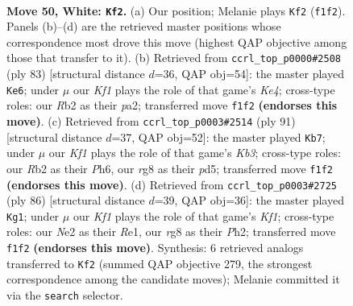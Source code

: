 \documentclass[11pt]{article}
\begin{document}
\clearpage

\begin{figure}[p]\centering
\begin{subfigure}{0.46\textwidth}\centering
\resizebox{\linewidth}{!}{%
\newchessgame
\chessboard[
  setfen={6r1/R7/3pk1p1/5n1p/8/1p6/1R2N1P1/5K1r w - - 6 50},
  showmover=false,
  pgfstyle=straightmove, color=movearrow, markmove={f1-f2}
]}
\caption{}
\end{subfigure}\hfill
\begin{subfigure}{0.46\textwidth}\centering
\resizebox{\linewidth}{!}{%
\newchessgame
\chessboard[
  setfen={3r4/8/8/pR2kp2/5n2/2N5/PPK2P2/8 b - - 6 42},
  showmover=false,
  pgfstyle=straightmove, color=movearrow, markmove={e5-e6}
]}
\caption{}
\end{subfigure}
\\[4pt]
\begin{subfigure}{0.46\textwidth}\centering
\resizebox{\linewidth}{!}{%
\newchessgame
\chessboard[
  setfen={8/8/nk2R2p/p2P4/4P2p/2P1KP2/r6P/8 b - - 3 46},
  showmover=false,
  pgfstyle=straightmove, color=movearrow, markmove={b6-b7}
]}
\caption{}
\end{subfigure}\hfill
\begin{subfigure}{0.46\textwidth}\centering
\resizebox{\linewidth}{!}{%
\newchessgame
\chessboard[
  setfen={3R4/p4pk1/5n2/p4rpp/8/8/6PP/4RK2 w - - 0 44},
  showmover=false,
  pgfstyle=straightmove, color=movearrow, markmove={f1-g1}
]}
\caption{}
\end{subfigure}
\caption{\textbf{Move 50, White: \texttt{Kf2}.} (a) Our position; Melanie plays \texttt{Kf2} (\texttt{f1f2}). Panels (b)--(d) are the retrieved master positions whose correspondence most drove this move (highest QAP objective among those that transfer to it). (b) Retrieved from \texttt{ccrl\_top\_p0000\#2508} (ply 83) [structural distance $d$=36, QAP obj=54]: the master played \texttt{Ke6}; under $\mu$ our \emph{Kf1} plays the role of that game's \emph{Ke4}; cross-type roles: our \emph{R}b2 as their \emph{p}a2; transferred move \texttt{f1f2} \textbf{(endorses this move)}. (c) Retrieved from \texttt{ccrl\_top\_p0003\#2514} (ply 91) [structural distance $d$=37, QAP obj=52]: the master played \texttt{Kb7}; under $\mu$ our \emph{Kf1} plays the role of that game's \emph{Kb3}; cross-type roles: our \emph{R}b2 as their \emph{P}h6, our \emph{r}g8 as their \emph{p}d5; transferred move \texttt{f1f2} \textbf{(endorses this move)}. (d) Retrieved from \texttt{ccrl\_top\_p0003\#2725} (ply 86) [structural distance $d$=39, QAP obj=36]: the master played \texttt{Kg1}; under $\mu$ our \emph{Kf1} plays the role of that game's \emph{Kf1}; cross-type roles: our \emph{N}e2 as their \emph{R}e1, our \emph{r}g8 as their \emph{P}h2; transferred move \texttt{f1f2} \textbf{(endorses this move)}. Synthesis: 6 retrieved analogs transferred to \texttt{Kf2} (summed QAP objective 279, the strongest correspondence among the candidate moves); Melanie committed it via the \texttt{search} selector.}
\label{fig:thought-m98}
\end{figure}
\end{document}
